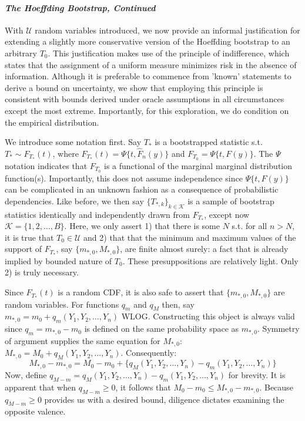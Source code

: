 \documentclass[12pt]{amsart}
\theoremstyle{plain}%
\theoremstyle{definition}
\theoremstyle{remark}
\numberwithin{equation}{section}
\begin{document}
\paragraph{\textit{The Hoeffding Bootstrap, Continued}} With $\mathcal{U}$ random variables introduced, we now provide an informal justification for extending a slightly more conservative version of the Hoeffding bootstrap to an arbitrary $T_0$. This justification makes use of the principle of indifference, which states that the assignment of a uniform measure minimizes risk in the absence of information. Although it is preferable to commence from 'known' statements to derive a bound on uncertainty, we show that employing this principle is consistent with bounds derived under oracle assumptions in all circumstances except the most extreme. Importantly, for this exploration, we do condition on the empirical distribution.

We introduce some notation first. Say $T_*$ is a bootstrapped statistic s.t. $T_* \sim F_{T_*}(t)$, where $F_{T_*}(t) = \Psi \{t, \hat{F}_n (y) \}$ and $F_{T_0} = \Psi \{t, F(y) \}$. The $\Psi$ notation indicates that $F_{T_0}$ is a functional of the marginal marginal distribution function(s). Importantly, this does not assume independence since $\Psi \{t, F(y) \}$ can be complicated in an unknown fashion as a consequence of probabilistic dependencies. Like before, we then say $\{ T_{*, k} \}_{k \in \mathcal{K}}$ is a sample of bootstrap statistics identically and independently drawn from $F_{T_*}$, except now $\mathcal{K} = \{1, 2, \ldots, B  \}$. Here, we only assert 1) that there is some $N$ s.t. for all $n > N$, it is true that $T_0 \in \mathcal{U}$ and 2) that that the minimum and maximum values of the support of $F_{T_*}$, say $\{m_{*, 0}, M_{*, 0} \}$, are finite almost surely: a fact that is already implied by bounded nature of $T_0$. These presuppositions are relatively light. Only 2) is truly necessary.

Since $F_{T_*}(t)$ is a random CDF, it is also safe to assert that $\{m_{*, 0}, M_{*, 0} \}$ are random variables. For functions $q_m$ and $q_M$ then, say $m_{*, 0} = m_0 + q_m (Y_1, Y_2, \ldots, Y_n)$ WLOG. Constructing this object is always valid since $q_m = m_{*, 0} - m_0$ is defined on the same probability space as $m_{*, 0}$. Symmetry of argument supplies the same equation for $M_{*, 0}$: $M_{*, 0} = M_0 + q_M(Y_1, Y_2, \ldots, Y_n)$. Consequently:
$$M_{*, 0} - m_{*, 0} = M_0 - m_0 + \{ q_M(Y_1, Y_2, \ldots, Y_n) - q_m(Y_1, Y_2, \ldots, Y_n) \}$$
Now, define $q_{M-m} = q_M(Y_1, Y_2, \ldots, Y_n) - q_m(Y_1, Y_2, \ldots, Y_n)$ for brevity. It is apparent that when $q_{M-m} \geq 0$, it follows that $M_{0} - m_{0}  \leq M_{*, 0} - m_{*, 0}$. Because $q_{M-m} \geq 0$ provides us with a desired bound, diligence dictates examining the opposite valence.
\end{document}
